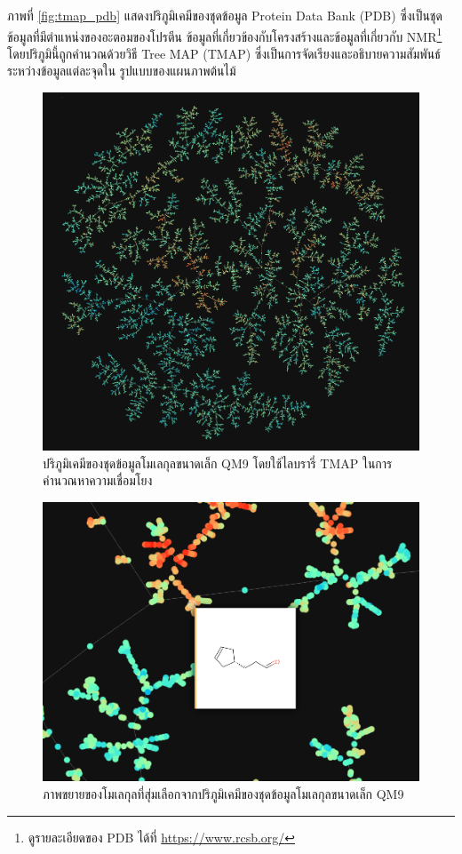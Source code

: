 ภาพที่ \ref{fig:tmap_pdb} แสดงปริภูมิเคมีของชุดข้อมูล Protein Data Bank (PDB) ซึ่งเป็นชุดข้อมูลที่มีตำแหน่งของอะตอมของโปรตีน
ข้อมูลที่เกี่ยวข้องกับโครงสร้างและข้อมูลที่เกี่ยวกับ NMR\footnote{ดูรายละเอียดของ PDB ได้ที่ \url{https://www.rcsb.org/}}
โดยปริภูมินี้ถูกคำนวณด้วยวิธี Tree MAP (TMAP)\autocite{probst2020} ซึ่งเป็นการจัดเรียงและอธิบายความสัมพันธ์ระหว่างข้อมูลแต่ละจุดใน%
รูปแบบของแผนภาพต้นไม้

\begin{figure}[htbp]
    \centering
    \includegraphics[width=0.9\linewidth]{fig/tmap_qm9.png}
    \caption{ปริภูมิเคมีของชุดข้อมูลโมเลกุลขนาดเล็ก QM9 โดยใช้ไลบรารี่ TMAP ในการคำนวณหาความเชื่อมโยง}
    \label{fig:tmap_qm9}
\end{figure}

\begin{figure}[htbp]
    \centering
    \includegraphics[width=0.9\linewidth]{fig/tmap_qm9_zoom.png}
    \caption{ภาพขยายของโมเลกุลที่สุ่มเลือกจากปริภูมิเคมีของชุดข้อมูลโมเลกุลขนาดเล็ก QM9}
    \label{fig:tmap_qm9_zoom}
\end{figure}

